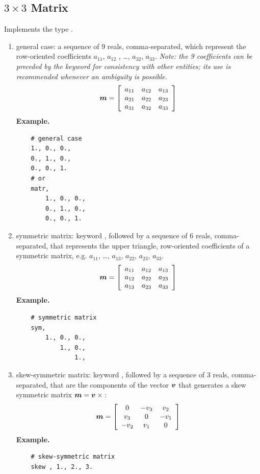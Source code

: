\subsection{$3 \times 3$ Matrix}
\label{sec:Mat3x3}
Implements the type .
\begin{enumerate}
    \item general case: a sequence of 9 reals, comma-separated, which
    represent the row-oriented coefficients $ a_{11} $, $ a_{12}$ ,
    \ldots, $ a_{32} $, $ a_{33} $.
    \emph{Note: the 9 coefficients can be preceded by the keyword
     for consistency with other entities; its use is recommended
    whenever an ambiguity is possible.}
\begin{equation}
	\T{m} = \sqbr{\matr{ccc}{
		a_{11} & a_{12} & a_{13} \\
		a_{21} & a_{22} & a_{23} \\
		a_{31} & a_{32} & a_{33}
	}}
\end{equation}
\textbf{Example.}
\begin{verbatim}
    # general case
    1., 0., 0.,
    0., 1., 0.,
    0., 0., 1.
    # or
    matr,
        1., 0., 0.,
        0., 1., 0.,
        0., 0., 1.
\end{verbatim}

    \item symmetric matrix: keyword , followed by a sequence
    of 6 reals, comma-separated, that represents the upper triangle, 
    row-oriented coefficients of a symmetric matrix, 
    e.g. $ a_{11} $, \ldots , $ a_{13} $, $ a_{22} $, $ a_{23} $, $ a_{33} $.
\begin{equation}
	\T{m} = \sqbr{\matr{ccc}{
		a_{11} & a_{12} & a_{13} \\
		a_{12} & a_{22} & a_{23} \\
		a_{13} & a_{23} & a_{33}
	}}
\end{equation}
\textbf{Example.}
\begin{verbatim}
    # symmetric matrix
    sym,
        1., 0., 0.,
            1., 0.,
                1.,
\end{verbatim}

    \item skew-symmetric matrix: keyword , followed by a sequence
    of 3 reals, comma-separated, that are the components of the vector $\T{v}$
    that generates a skew symmetric matrix $\T{m}=\T{v}\times{}$:
\begin{equation}
	\T{m} = \sqbr{\matr{ccc}{
		0 & -v_3 & v_2 \\
		v_3 & 0 & -v_1 \\
		-v_2 & v_1 & 0
	}}
\end{equation}
\textbf{Example.}
\begin{verbatim}
    # skew-symmetric matrix
    skew , 1., 2., 3.
\end{verbatim}


\end{enumerate}
